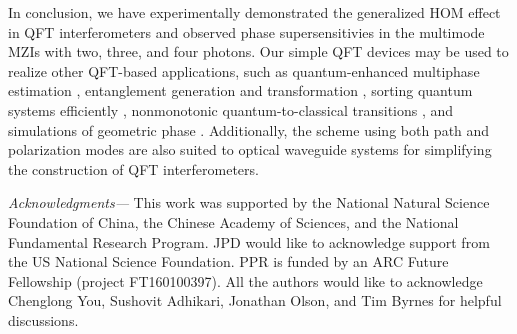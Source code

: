 \documentclass[aps,prl,twocolumn,superscriptaddress]{revtex4-1}
\begin{document}
In conclusion, we have experimentally demonstrated the generalized HOM effect in QFT interferometers and observed phase supersensitivies in the multimode MZIs with two, three, and four photons. Our simple QFT devices may be used to realize other QFT-based applications, such as quantum-enhanced multiphase estimation \cite{humphreys2013,ciampini2016,*szczykulska2016}, entanglement generation and transformation \cite{lim2005b}, sorting quantum systems efficiently \cite{ionicioiu2016}, nonmonotonic quantum-to-classical transitions \cite{tichy2011,*ra2013}, and simulations of geometric phase \cite{laing2012}. Additionally, the scheme using both path and polarization modes are also suited to optical waveguide systems for simplifying the construction of QFT interferometers.


{\em Acknowledgments---} This work was supported by the National Natural Science Foundation of China, the Chinese Academy of Sciences, and the National Fundamental Research Program. JPD would like to acknowledge support from the US National Science Foundation. PPR is funded by an ARC Future Fellowship (project FT160100397). All the authors would like to acknowledge Chenglong You, Sushovit Adhikari, Jonathan Olson, and Tim Byrnes for helpful discussions.
\end{document}
